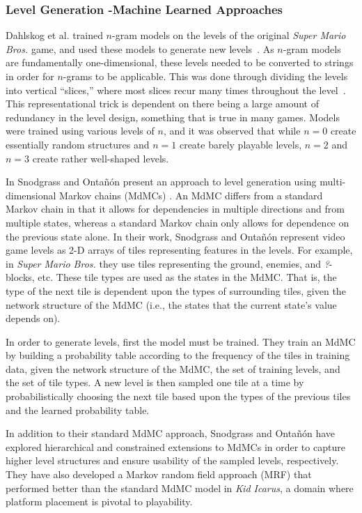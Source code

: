 \documentclass[a4paper]{article}
\begin{document}
\subsubsection{Level Generation -Machine Learned Approaches}

Dahlskog et al. trained $n$-gram models on the levels of the original \textit{Super Mario Bros.} game, and used these models to generate new levels~\cite{dahlskog2014linear}. As $n$-gram models are fundamentally one-dimensional, these levels needed to be converted to strings in order for $n$-grams to be applicable. This was done through dividing the levels into vertical ``slices,'' where most slices recur many times throughout the level~\cite{dahlskog2013patterns}. This representational trick is dependent on there being a large amount of redundancy in the level design, something that is true in many games. Models were trained using various levels of $n$, and it was observed that while $n=0$ create essentially random structures and $n=1$ create barely playable levels, $n=2$ and $n=3$ create rather well-shaped levels.


In \cite{snodgrass2014experiments} Snodgrass and Onta{\~n}{\'o}n present an approach to level generation using multi-dimensional Markov chains (MdMCs) \cite{ching2007multi}. An MdMC differs from a standard Markov chain in that it allows for dependencies in multiple directions and from multiple states, whereas a standard Markov chain only allows for dependence on the previous state alone. In their work, Snodgrass and Onta{\~n}{\'o}n represent video game levels as 2-D arrays of tiles representing features in the levels. For example, in \textit{Super Mario Bros.} they use tiles representing the ground, enemies, and {\em ?}-blocks, etc. These tile types are used as the states in the MdMC. That is, the type of the next tile is dependent upon the types of surrounding tiles, given the network structure of the MdMC (i.e., the states that the current state's value depends on).

In order to generate levels, first the model must be trained. They train an MdMC by building a probability table according to the frequency of the tiles in training data, given the network structure of the MdMC, the set of training levels, and the set of tile types. A new level is then sampled one tile at a time by probabilistically choosing the next tile based upon the types of the previous tiles and the learned probability table.

In addition to their standard MdMC approach, Snodgrass and Onta{\~n}{\'o}n have explored hierarchical \cite{snodgrass2015hierarchical} and constrained \cite{snodgrassconstrained} extensions to MdMCs in order to capture higher level structures and ensure usability of the sampled levels, respectively. They have also developed a Markov random field approach (MRF) \cite{snodgrass2016learning} that performed better than the standard MdMC model in \textit{Kid Icarus}, a domain where platform placement is pivotal to playability.
\end{document}

